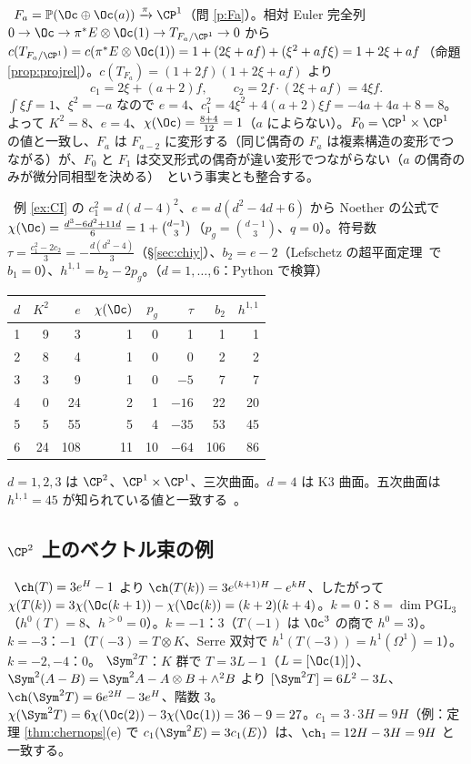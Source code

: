 \begin{ex}\label{ex:Fa}\tP\
$F_a=\mathbb P(\Oc\oplus\Oc(a))\xrightarrow{\pi}\CP^1$（問 \ref{p:Fa}）。相対 Euler 完全列 $0\to\Oc\to\pi^*E\otimes\Oc(1)\to T_{F_a/\CP^1}\to0$ から $c(T_{F_a/\CP^1})=c(\pi^*E\otimes\Oc(1))=1+(2\xi+af)+(\xi^2+af\xi)=1+2\xi+af$（命題 \ref{prop:projrel}）。$c(T_{F_a})=(1+2f)(1+2\xi+af)$ より
\[
c_1=2\xi+(a+2)f,\qquad c_2=2f\cdot(2\xi+af)=4\xi f.
\]
$\int\xi f=1$、$\xi^2=-a$ なので $e=4$、$c_1^2=4\xi^2+4(a+2)\xi f=-4a+4a+8=8$。よって $K^2=8$、$e=4$、$\chi(\Oc)=\frac{8+4}{12}=1$（$a$ によらない）。$F_0=\CP^1\times\CP^1$ の値と一致し、$F_a$ は $F_{a-2}$ に変形する（同じ偶奇の $F_a$ は複素構造の変形でつながる）が、$F_0$ と $F_1$ は交叉形式の偶奇が違い変形でつながらない（$a$ の偶奇のみが微分同相型を決める）\tC\ という事実とも整合する。
\end{ex}
\begin{ex}[$\CP^3$ の次数 $d$ の曲面]\label{ex:surfd}\tP\
例 \ref{ex:CI} の $c_1^2=d(d-4)^2$、$e=d(d^2-4d+6)$ から Noether の公式で $\chi(\Oc)=\frac{d^3-6d^2+11d}6=1+\binom{d-1}3$（$p_g=\binom{d-1}3$、$q=0$）。符号数 $\tau=\frac{c_1^2-2c_2}3=-\frac{d(d^2-4)}3$（\S\ref{sec:chiy}）、$b_2=e-2$（Lefschetz の超平面定理\tC\ で $b_1=0$）、$h^{1,1}=b_2-2p_g$。（$d=1,\dots,6$：Python で検算）
\begin{center}
\begin{tabular}{r|rrrrrrr}
\toprule
$d$ & $K^2$ & $e$ & $\chi(\Oc)$ & $p_g$ & $\tau$ & $b_2$ & $h^{1,1}$\\
\midrule
1 & 9 & 3 & 1 & 0 & 1 & 1 & 1\\
2 & 8 & 4 & 1 & 0 & 0 & 2 & 2\\
3 & 3 & 9 & 1 & 0 & $-5$ & 7 & 7\\
4 & 0 & 24 & 2 & 1 & $-16$ & 22 & 20\\
5 & 5 & 55 & 5 & 4 & $-35$ & 53 & 45\\
6 & 24 & 108 & 11 & 10 & $-64$ & 106 & 86\\
\bottomrule
\end{tabular}
\end{center}
$d=1,2,3$ は $\CP^2$、$\CP^1\times\CP^1$、三次曲面。$d=4$ は K3 曲面。五次曲面は $h^{1,1}=45$ が知られている値と一致する\tC\ 。
\end{ex}


\subsection{$\CP^2$ 上のベクトル束の例}
\begin{ex}[$T_{\CP^2}(k)$ と $\Sym^2T_{\CP^2}$]\label{ex:TP2}\tP\
$\ch(T)=3e^H-1$ より $\ch(T(k))=3e^{(k+1)H}-e^{kH}$、したがって $\chi(T(k))=3\chi(\Oc(k+1))-\chi(\Oc(k))=(k+2)(k+4)$。$k=0$：$8=\dim\mathrm{PGL}_3$（$h^0(T)=8$、$h^{>0}=0$）。$k=-1$：$3$（$T(-1)$ は $\Oc^3$ の商で $h^0=3$）。$k=-3$：$-1$（$T(-3)=T\otimes K$、Serre 双対で $h^1(T(-3))=h^1(\Omega^1)=1$）。$k=-2,-4$：$0$。
$\Sym^2T$：$K$ 群で $T=3L-1$（$L=[\Oc(1)]$）、$\Sym^2(A-B)=\Sym^2A-A\otimes B+\wedge^2B$ より $[\Sym^2T]=6L^2-3L$、$\ch(\Sym^2T)=6e^{2H}-3e^{H}$、階数 $3$。$\chi(\Sym^2T)=6\chi(\Oc(2))-3\chi(\Oc(1))=36-9=27$。$c_1=3\cdot3H=9H$（例：定理 \ref{thm:chernops}(e) で $c_1(\Sym^2E)=3c_1(E)$）は、$\ch_1=12H-3H=9H$ と一致する。
\end{ex}
